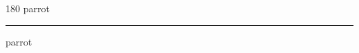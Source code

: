
\begin{frame}
\begin{center}
\begin{turn}{180}
{\fontsize{2.5cm}{1em}\selectfont parrot}
\end{turn}
\vspace{1em}\par  
\hrule
\vspace{1em}\par  
{\fontsize{2.5cm}{1em}\selectfont parrot}
\end{center}
\end{frame}
